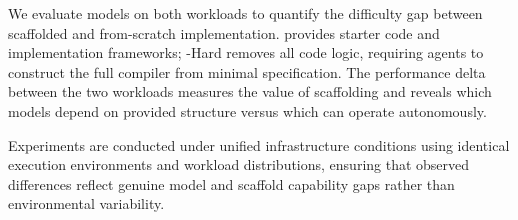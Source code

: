 We evaluate models on both workloads to quantify the difficulty gap between scaffolded and from-scratch implementation.
\yatcc{} provides starter code and implementation frameworks; \yatcc{}-Hard removes all code logic, requiring agents to construct the full compiler from minimal specification.
The performance delta between the two workloads measures the value of scaffolding and reveals which models depend on provided structure versus which can operate autonomously.

Experiments are conducted under unified infrastructure conditions using identical execution environments and workload distributions, ensuring that observed differences reflect genuine model and scaffold capability gaps rather than environmental variability.
